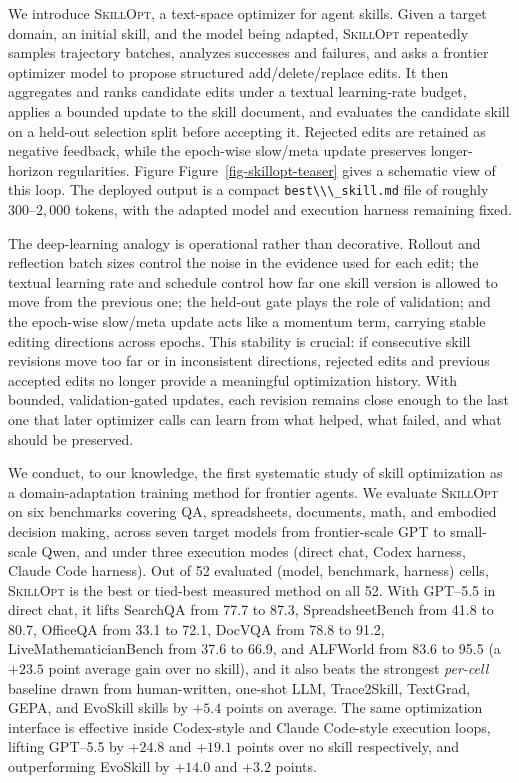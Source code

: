 \documentclass[
]{article}
\newcommand{\passthrough}[1]{#1}
\newcommand{\ourmethod}{\textsc{SkillOpt}\xspace}
\begin{document}
We introduce \ourmethod{}, a text-space optimizer for agent skills.
Given a target domain, an initial skill, and the model being adapted,
\ourmethod{} repeatedly samples trajectory batches, analyzes successes
and failures, and asks a frontier optimizer model to propose structured
add/delete/replace edits. It then aggregates and ranks candidate edits
under a textual learning-rate budget, applies a bounded update to the
skill document, and evaluates the candidate skill on a held-out
selection split before accepting it. Rejected edits are retained as
negative feedback, while the epoch-wise slow/meta update preserves
longer-horizon regularities. Figure Figure~\ref{fig-skillopt-teaser}
gives a schematic view of this loop. The deployed output is a compact
\passthrough{\lstinline!best\\\_skill.md!} file of roughly
\(300\)--\(2{,}000\) tokens, with the adapted model and execution
harness remaining fixed.

The deep-learning analogy is operational rather than decorative. Rollout
and reflection batch sizes control the noise in the evidence used for
each edit; the textual learning rate and schedule control how far one
skill version is allowed to move from the previous one; the held-out
gate plays the role of validation; and the epoch-wise slow/meta update
acts like a momentum term, carrying stable editing directions across
epochs. This stability is crucial: if consecutive skill revisions move
too far or in inconsistent directions, rejected edits and previous
accepted edits no longer provide a meaningful optimization history. With
bounded, validation-gated updates, each revision remains close enough to
the last one that later optimizer calls can learn from what helped, what
failed, and what should be preserved.

We conduct, to our knowledge, the first systematic study of skill
optimization as a domain-adaptation training method for frontier agents.
We evaluate \ourmethod{} on six benchmarks covering QA, spreadsheets,
documents, math, and embodied decision making, across seven target
models from frontier-scale GPT to small-scale Qwen, and under three
execution modes (direct chat, Codex harness, Claude Code harness). Out
of 52 evaluated (model, benchmark, harness) cells, \ourmethod{} is the
best or tied-best measured method on all 52. With GPT--5.5 in direct
chat, it lifts SearchQA from 77.7 to 87.3, SpreadsheetBench from 41.8 to
80.7, OfficeQA from 33.1 to 72.1, DocVQA from 78.8 to 91.2,
LiveMathematicianBench from 37.6 to 66.9, and ALFWorld from 83.6 to 95.5
(a \(+23.5\) point average gain over no skill), and it also beats the
strongest \emph{per-cell} baseline drawn from human-written, one-shot
LLM, Trace2Skill, TextGrad, GEPA, and EvoSkill skills by \(+5.4\) points
on average. The same optimization interface is effective inside
Codex-style and Claude Code-style execution loops, lifting GPT--5.5 by
\(+24.8\) and \(+19.1\) points over no skill respectively, and
outperforming EvoSkill by \(+14.0\) and \(+3.2\) points.
\end{document}
